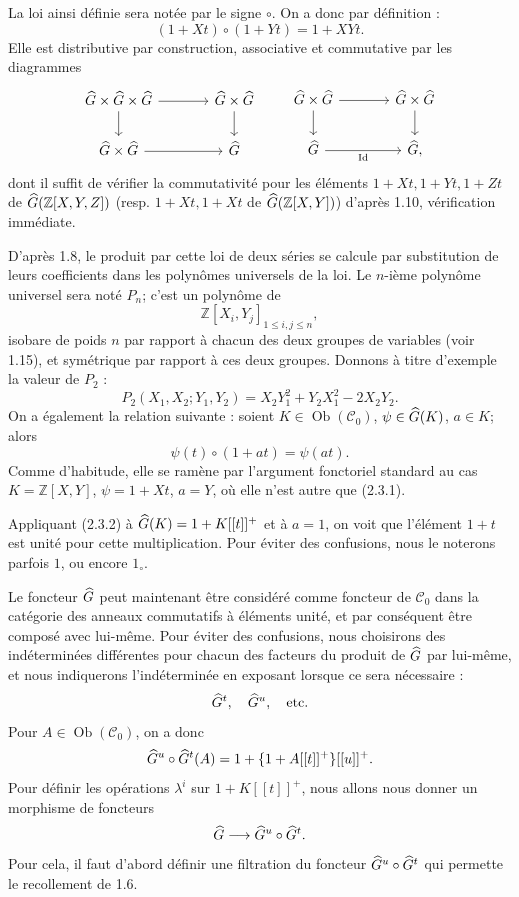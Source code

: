 \documentclass[11pt]{article}
\begin{document}
La loi ainsi définie sera notée par le signe \(\circ\). On a donc par définition :
\begin{equation}\tag{2.3.1}
  (1+Xt)\circ(1+Yt)=1+XYt.
\end{equation}
Elle est distributive par construction, associative et commutative par les diagrammes
\[
\begin{tikzcd}[column sep=large]
\Ghat\times\Ghat\times\Ghat \arrow[r] \arrow[d] &
\Ghat\times\Ghat \arrow[d]\\
\Ghat\times\Ghat \arrow[r] & \Ghat
\end{tikzcd}
\qquad
\begin{tikzcd}[column sep=large]
\Ghat\times\Ghat \arrow[r] \arrow[d] &
\Ghat\times\Ghat \arrow[d]\\
\Ghat \arrow[r,"\id"'] & \Ghat,
\end{tikzcd}
\]
dont il suffit de vérifier la commutativité pour les éléments \(1+Xt,1+Yt,1+Zt\) de \(\widehat G(\mathbb Z[X,Y,Z])\) (resp. \(1+Xt,1+Xt\) de \(\widehat G(\mathbb Z[X,Y])\)) d'après 1.10, vérification immédiate.

D'après 1.8, le produit par cette loi de deux séries se calcule par substitution de leurs coefficients dans les polynômes universels de la loi. Le \(n\)-ième polynôme universel sera noté \(P_n\); c'est un polynôme de
\[
  \mathbb Z[X_i,Y_j]_{1\leq i,j\leq n},
\]
isobare de poids \(n\) par rapport à chacun des deux groupes de variables (voir 1.15), et symétrique par rapport à ces deux groupes. Donnons à titre d'exemple la valeur de \(P_2\) :
\[
  P_2(X_1,X_2;Y_1,Y_2)=X_2Y_1^2+Y_2X_1^2-2X_2Y_2.
\]
On a également la relation suivante : soient \(K\in\operatorname{Ob}(\mathcal C_0)\), \(\psi\in\widehat G(K)\), \(a\in K\); alors
\begin{equation}\tag{2.3.2}
  \psi(t)\circ(1+at)=\psi(at).
\end{equation}
Comme d'habitude, elle se ramène par l'argument fonctoriel standard au cas \(K=\mathbb Z[X,Y]\), \(\psi=1+Xt\), \(a=Y\), où elle n'est autre que (2.3.1).

Appliquant (2.3.2) à \(\widehat G(K)=1+K[[t]]^+\) et à \(a=1\), on voit que l'élément \(1+t\) est unité pour cette multiplication. Pour éviter des confusions, nous le noterons parfois \(1\), ou encore \(1_\circ\).

Le foncteur \(\widehat G\) peut maintenant être considéré comme foncteur de \(\mathcal C_0\) dans la catégorie des anneaux commutatifs à éléments unité, et par conséquent être composé avec lui-même. Pour éviter des confusions, nous choisirons des indéterminées différentes pour chacun des facteurs du produit de \(\widehat G\) par lui-même, et nous indiquerons l'indéterminée en exposant lorsque ce sera nécessaire :
\[
  \widehat G^t,\quad \widehat G^u,\quad\text{etc.}
\]
Pour \(A\in\operatorname{Ob}(\mathcal C_0)\), on a donc
\[
  \widehat G^u\circ\widehat G^t(A)=1+\{1+A[[t]]^+\}[[u]]^+.
\]
Pour définir les opérations \(\lambda^i\) sur \(1+K[[t]]^+\), nous allons nous donner un morphisme de foncteurs
\[
  \widehat G\longrightarrow\widehat G^u\circ\widehat G^t.
\]
Pour cela, il faut d'abord définir une filtration du foncteur \(\widehat G^u\circ\widehat G^t\) qui permette le recollement de 1.6.
\end{document}
